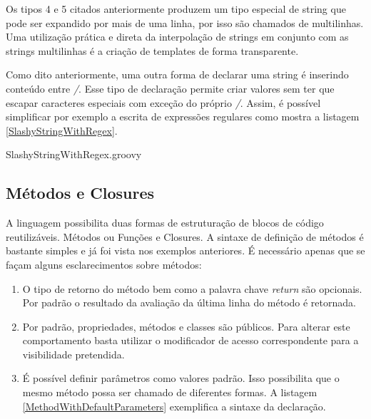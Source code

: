 \documentclass[12pt]{article}
\begin{document}
    Os tipos 4 e 5 citados anteriormente produzem um tipo especial de string que
    pode ser expandido por mais de uma linha, por isso são chamados de multilinhas.
    Uma utilização prática e direta da interpolação de strings em conjunto com as
    strings multilinhas é a criação de templates de forma transparente. 
    
    Como dito anteriormente, uma outra forma de declarar uma string é inserindo
    conteúdo entre \emph{/}. Esse tipo de declaração permite criar valores sem 
    ter que escapar caracteres especiais com exceção do próprio \emph{/}. Assim, 
    é possível simplificar por exemplo a escrita de expressões regulares como 
    mostra a listagem \ref{SlashyStringWithRegex}.
    
    
                    {SlashyStringWithRegex.groovy}

\subsection{Métodos e Closures}

    A linguagem possibilita duas formas de estruturação de blocos de código 
    reutilizáveis. Métodos ou Funções e Closures. A sintaxe de definição de métodos
    é bastante simples e já foi vista nos exemplos anteriores. É necessário apenas
    que se façam alguns esclarecimentos sobre métodos:

    \begin{enumerate}
        \item O tipo de retorno do método bem como a palavra chave \emph{return}
              são opcionais. Por padrão o resultado da avaliação da última linha
              do método é retornada.
        \item Por padrão, propriedades, métodos e classes são públicos. Para alterar
              este comportamento basta utilizar o modificador de acesso correspondente
              para a visibilidade pretendida.
        \item É possível definir parâmetros como valores padrão. Isso possibilita
              que o mesmo método possa ser chamado de diferentes formas. A listagem
              \ref{MethodWithDefaultParameters} exemplifica a sintaxe da declaração.
    \end{enumerate}
    
\end{document}
